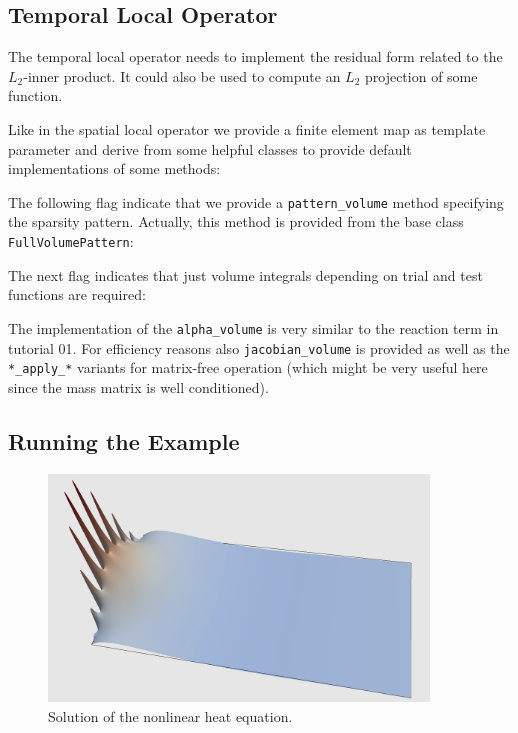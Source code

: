\documentclass[a4paper,12pt]{article}
\begin{document}
\subsection{Temporal Local Operator}

The temporal local operator needs to implement the
residual form related to the $L_2$-inner product. It could also
be used to compute an $L_2$ projection of some function.

Like in the spatial local operator we provide a finite element
map as template parameter and derive from some helpful
classes to provide default implementations of some methods:


The following flag indicate that we provide a \lstinline{pattern_volume} method
specifying the sparsity pattern. Actually, this method is provided from the base class
\lstinline{FullVolumePattern}:


The next flag indicates that just volume integrals depending
on trial and test functions are required:


The implementation of the \lstinline{alpha_volume}
is very similar to the reaction term in tutorial 01. For efficiency reasons
also \lstinline{jacobian_volume} is provided as well as the
\lstinline{*_apply_*} variants for matrix-free operation (which might
be very useful here since the mass matrix is well conditioned).

\subsection{Running the Example}

\begin{figure}
\begin{center}
\includegraphics[width=0.9\textwidth]{warp}
\end{center}
\caption{Solution of the nonlinear heat equation.}
\label{fig:Bunt}
\end{figure}
\end{document}
